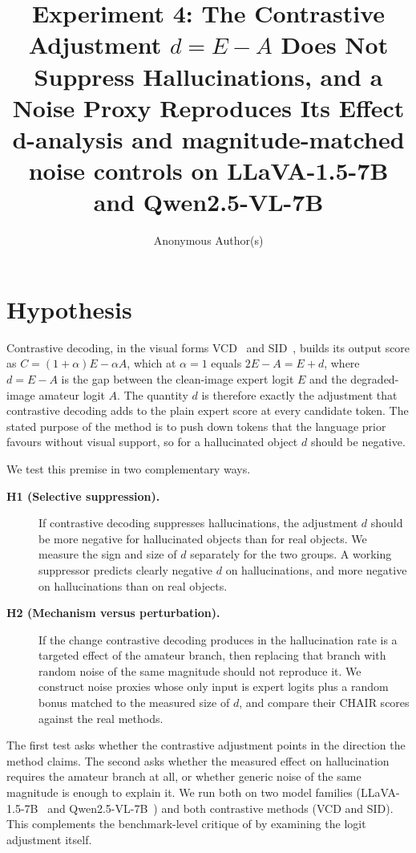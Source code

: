 \documentclass{article}
\title{Experiment 4: The Contrastive Adjustment $d = E - A$ Does Not Suppress
Hallucinations, and a Noise Proxy Reproduces Its Effect\\
\large d-analysis and magnitude-matched noise controls on LLaVA-1.5-7B and Qwen2.5-VL-7B}
\author{Anonymous Author(s)}
\begin{document}
\maketitle


\section{Hypothesis}
\label{sec:dproxy-hypothesis}

Contrastive decoding, in the visual forms VCD~\citep{leng2024vcd} and
SID~\citep{huo2024sid}, builds its output score as
$C = (1+\alpha)E - \alpha A$, which at $\alpha = 1$ equals $2E - A = E + d$,
where $d = E - A$ is the gap between the clean-image expert logit $E$ and the
degraded-image amateur logit $A$. The quantity $d$ is therefore exactly the
adjustment that contrastive decoding adds to the plain expert score at every
candidate token. The stated purpose of the method is to push down tokens that
the language prior favours without visual support, so for a hallucinated object
$d$ should be negative.

We test this premise in two complementary ways.

\begin{description}
  \item[\textbf{H1 (Selective suppression).}] If contrastive decoding suppresses
  hallucinations, the adjustment $d$ should be more negative for hallucinated
  objects than for real objects. We measure the sign and size of $d$ separately
  for the two groups. A working suppressor predicts clearly negative $d$ on
  hallucinations, and more negative on hallucinations than on real objects.
  \item[\textbf{H2 (Mechanism versus perturbation).}] If the change contrastive
  decoding produces in the hallucination rate is a targeted effect of the
  amateur branch, then replacing that branch with random noise of the same
  magnitude should not reproduce it. We construct noise proxies whose only input
  is expert logits plus a random bonus matched to the measured size of $d$, and
  compare their CHAIR scores against the real methods.
\end{description}

\noindent The first test asks whether the contrastive adjustment points in the
direction the method claims. The second asks whether the measured effect on
hallucination requires the amateur branch at all, or whether generic noise of
the same magnitude is enough to explain it. We run both on two model families
(LLaVA-1.5-7B~\citep{liu2024llava} and
Qwen2.5-VL-7B~\citep{bai2025qwen25vl}) and both contrastive methods (VCD and
SID). This complements the benchmark-level critique of
\citet{yin2025mirage} by examining the logit adjustment itself.
\end{document}
